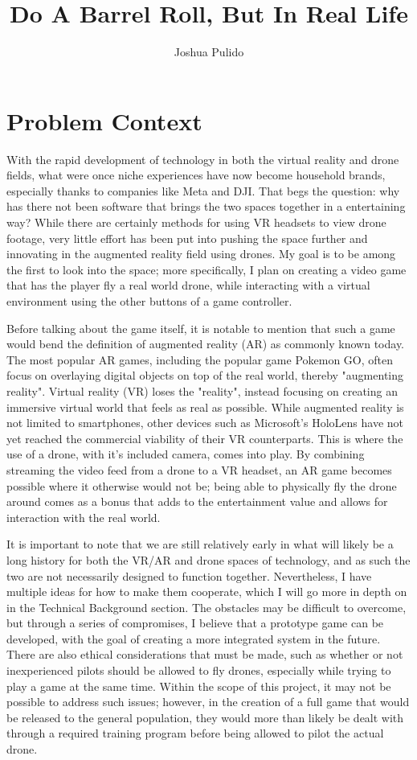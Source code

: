 \documentclass[10pt,twocolumn]{article}
\title{Do A Barrel Roll, But In Real Life}
\author{Joshua Pulido}
\affiliation{Occidental College}
\begin{document}
\maketitle

\section{Problem Context}
With the rapid development of technology in both the virtual reality and drone fields, what were once niche experiences have now become household brands, especially thanks to companies like Meta and DJI. That begs the question: why has there not been software that brings the two spaces together in a entertaining way? While there are certainly methods for using VR headsets to view drone footage, very little effort has been put into pushing the space further and innovating in the augmented reality field using drones. My goal is to be among the first to look into the space; more specifically, I plan on creating a video game that has the player fly a real world drone, while interacting with a virtual environment using the other buttons of a game controller.

Before talking about the game itself, it is notable to mention that such a game would bend the definition of augmented reality (AR) as commonly known today. The most popular AR games, including the popular game Pokemon GO, often focus on overlaying digital objects on top of the real world, thereby "augmenting reality".  Virtual reality (VR) loses the "reality", instead focusing on creating an immersive virtual world that feels as real as possible. While augmented reality is not limited to smartphones, other devices such as Microsoft's HoloLens have not yet reached the commercial viability of their VR counterparts. This is where the use of a drone, with it's included camera, comes into play. By combining streaming the video feed from a drone to a VR headset, an AR game becomes possible where it otherwise would not be; being able to physically fly the drone around comes as a bonus that adds to the entertainment value and allows for interaction with the real world.

It is important to note that we are still relatively early in what will likely be a long history for both the VR/AR and drone spaces of technology, and as such the two are not necessarily designed to function together. Nevertheless, I have multiple ideas for how to make them cooperate, which I will go more in depth on in the Technical Background section. The obstacles may be difficult to overcome, but through a series of compromises, I believe that a prototype game can be developed, with the goal of creating a more integrated system in the future. There are also ethical considerations that must be made, such as whether or not inexperienced pilots should be allowed to fly drones, especially while trying to play a game at the same time. Within the scope of this project, it may not be possible to address such issues; however, in the creation of a full game that would be released to the general population, they would more than likely be dealt with through a required training program before being allowed to pilot the actual drone.
\end{document}
